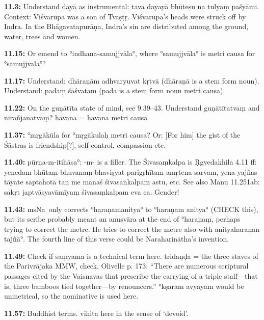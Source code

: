 \documentclass{article}
\newcommand{\vsnum}[1]{\textbf{#1}}
\newcommand{\msNa}{msNa}
\begin{document}
\vsnum{11.3: }Understand dayā as instrumental: tava dayayā bhūteṣu na tulyaṃ paśyāmi. Context: Viśvarūpa was a son of Tvaṣṭṛ. Viśvarūpa's heads were struck off by Indra. In the Bhāgavatapurāṇa, Indra's sin are distributed among the ground, water, trees and women.

\vsnum{11.15: }Or emend to °indhana-samujjvāla°, where °samujjvāla° is metri causa for °samujjvala°?

\vsnum{11.17: }Understand: dhāraṇām adhvaryuvat kṛtvā (dhāraṇā is a stem form noun). Understand: padaṃ śāśvatam (pada is a stem form noun metri causa).

\vsnum{11.22: }On the guṇātīta state of mind, see 9.39--43. Understand guṇātītatvaṃ and nirañjanatvaṃ? hāvana = havana metri causa

\vsnum{11.37: }°mṛgākūla for °mṛgākulaḥ metri causa? Or: [For him] the gist of the Śāstras is friendship[?], self-control, compassion etc.

\vsnum{11.40: }pūrṇa-m-itihāsa°: -m- is a filler. The Śivasaṃkalpa is Ṛgvedakhila 4.11 ff: yenedam bhūtaṃ bhuvanaṃ bhaviṣyat parigṛhītam amṛtena sarvam, yena yajñas tāyate saptahotā tan me manaś śivasaṅkalpam astu, etc. See also Manu 11.251ab: sakṛt japtvāsyavāmīyaṃ śivasaṃkalpam eva ca. Gender!

\vsnum{11.43: }\msNa\ only corrects °haraṇamanitya° to °haraṇam anitya° (CHECK this), but its scribe probably meant an anusvāra at the end of °haraṇaṃ, perhaps trying to correct the metre. He tries to correct the metre also with anityaharaṇan tajñā°. The fourth line of this verse could be Naraharinātha's invention.

\vsnum{11.49: }Check if saṃyama is a technical term here. tridaṇḍa = the three staves of the Parivrājaka MMW, check. Olivelle p. 173: ``There are numerous scriptural passages cited by the Vaisnavas that prescribe the carrying of a triple staff---that is, three bamboos tied together---by renouncers.'' °kṣaram avyayam would be unmetrical, so the nominative is used here.


\vsnum{11.57: }Buddhist terms. vihita here in the sense of `devoid'. 
\end{document}
